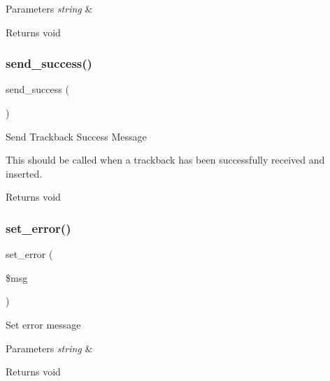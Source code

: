 \begin{DoxyParams}{Parameters}
{\em string} & \\
\hline
\end{DoxyParams}
\begin{DoxyReturn}{Returns}
void 
\end{DoxyReturn}
\mbox{\label{class_c_i___trackback_a57468453a4dc88340fdf12fb6e314248}} 
\subsubsection{\texorpdfstring{send\+\_\+success()}{send\_success()}}
{\footnotesize\ttfamily send\+\_\+success (\begin{DoxyParamCaption}{ }\end{DoxyParamCaption})}

Send Trackback Success Message

This should be called when a trackback has been successfully received and inserted.

\begin{DoxyReturn}{Returns}
void 
\end{DoxyReturn}
\mbox{\label{class_c_i___trackback_a892f1ba7cba3731a3fc68f1f64e92610}} 
\subsubsection{\texorpdfstring{set\+\_\+error()}{set\_error()}}
{\footnotesize\ttfamily set\+\_\+error (\begin{DoxyParamCaption}\item[{}]{\$msg }\end{DoxyParamCaption})}

Set error message


\begin{DoxyParams}{Parameters}
{\em string} & \\
\hline
\end{DoxyParams}
\begin{DoxyReturn}{Returns}
void 
\end{DoxyReturn}
\mbox{\label{class_c_i___trackback_a5caa264fab6d2b2344e6bd5b298b08f2}} 
